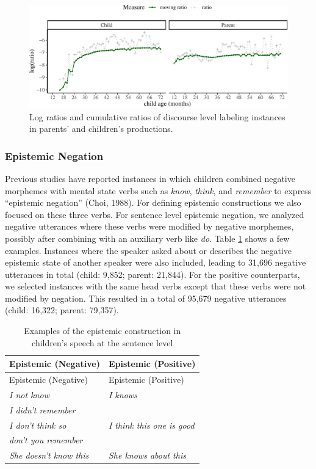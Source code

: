 \documentclass[
  english,
  man,floatsintext]{apa6}
\begin{document}
\begin{figure}[H]

{\centering \includegraphics{neg_construction_article_files/figure-latex/learningdiscourse-1} 

}

\caption{Log ratios and cumulative ratios of discourse level labeling instances in parents' and children's productions.}\label{fig:learningdiscourse}
\end{figure}

\hypertarget{epistemic-negation}{%
\subsubsection{Epistemic Negation}\label{epistemic-negation}}

Previous studies have reported instances in which children combined negative morphemes with mental state verbs such as \emph{know}, \emph{think}, and \emph{remember} to express ``epistemic negation'' (Choi, 1988). For defining epistemic constructions we also focused on these three verbs. For sentence level epistemic negation, we analyzed negative utterances where these verbs were modified by negative morphemes, possibly after combining with an auxiliary verb like \emph{do}. Table \ref{tab:epistem} shows a few examples. Instances where the speaker asked about or describes the negative epistemic state of another speaker were also included, leading to 31,696 negative utterances in total (child: 9,852; parent: 21,844). For the positive counterparts, we selected instances with the same head verbs except that these verbs were not modified by negation. This resulted in a total of 95,679 negative utterances (child: 16,322; parent: 79,357).

\begin{longtable}[]{@{}ll@{}}
\caption{\label{tab:epistem} Examples of the epistemic construction in children's speech at the sentence level}\tabularnewline
\toprule
Epistemic (Negative) & Epistemic (Positive) \\
\midrule
\endfirsthead
\toprule
Epistemic (Negative) & Epistemic (Positive) \\
\midrule
\endhead
\emph{I not know} & \emph{I knows} \\
\emph{I didn't remember} & \\
\emph{I don't think so} & \emph{I think this one is good} \\
\emph{don't you remember} & \\
\emph{She doesn't know this} & \emph{She knows about this} \\
\bottomrule
\end{longtable}
\end{document}
